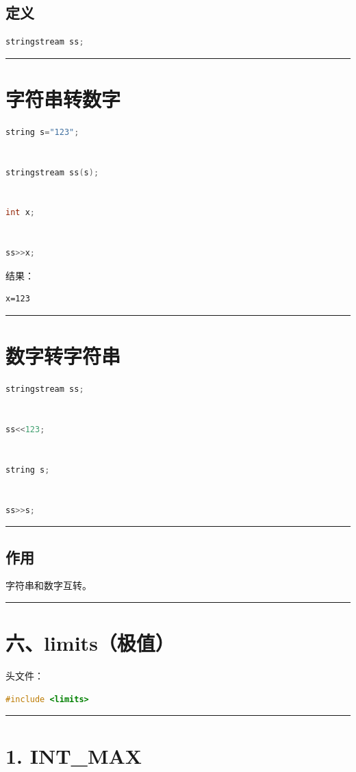 \documentclass[10pt,twocolumn]{extarticle}
\begin{document}
\subsection{定义}
\begin{lstlisting}[language=C++]
stringstream ss;
\end{lstlisting}

\noindent\rule{\linewidth}{0.4pt}

\section{字符串转数字}
\begin{lstlisting}[language=C++]
string s="123";


stringstream ss(s);


int x;


ss>>x;
\end{lstlisting}
结果：
\begin{lstlisting}
x=123
\end{lstlisting}

\noindent\rule{\linewidth}{0.4pt}

\section{数字转字符串}
\begin{lstlisting}[language=C++]
stringstream ss;


ss<<123;


string s;


ss>>s;
\end{lstlisting}

\noindent\rule{\linewidth}{0.4pt}

\subsection{作用}
字符串和数字互转。

\noindent\rule{\linewidth}{0.4pt}

\section{六、limits（极值）}

头文件：
\begin{lstlisting}[language=C++]
#include <limits>
\end{lstlisting}

\noindent\rule{\linewidth}{0.4pt}

\section{1. INT\_MAX}
\end{document}
